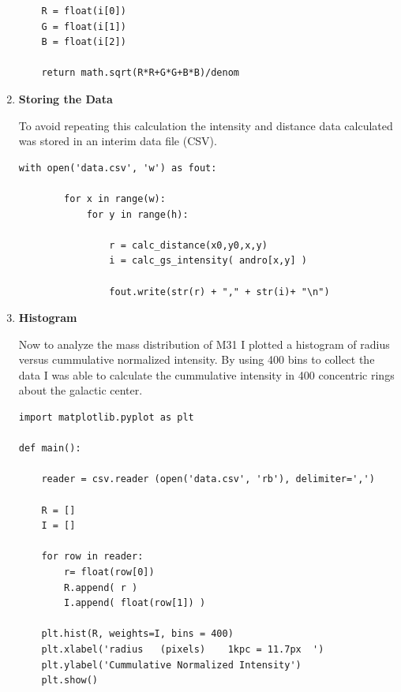 \begin{enumerate}
\begin{verbatim}
    R = float(i[0])
    G = float(i[1])
    B = float(i[2])

    return math.sqrt(R*R+G*G+B*B)/denom
\end{verbatim}

\item \textbf{Storing the Data}

To avoid repeating this calculation the intensity and distance data calculated was stored in an interim data file (CSV).

\begin{verbatim}
with open('data.csv', 'w') as fout:

        for x in range(w):
            for y in range(h):

                r = calc_distance(x0,y0,x,y)
                i = calc_gs_intensity( andro[x,y] )

                fout.write(str(r) + "," + str(i)+ "\n")
\end{verbatim}

\item \textbf{Histogram}

Now to analyze the mass distribution of M31 I plotted a histogram of radius versus cummulative normalized intensity. By using 400 bins to collect the data I was able to calculate the cummulative intensity in 400 concentric rings about the galactic center.

\begin{verbatim}
import matplotlib.pyplot as plt

def main():

    reader = csv.reader (open('data.csv', 'rb'), delimiter=',')

    R = []
    I = []

    for row in reader:
        r= float(row[0])
        R.append( r )
        I.append( float(row[1]) )

    plt.hist(R, weights=I, bins = 400)
    plt.xlabel('radius   (pixels)    1kpc = 11.7px  ')
    plt.ylabel('Cummulative Normalized Intensity')
    plt.show()

\end{verbatim}


\end{enumerate}
